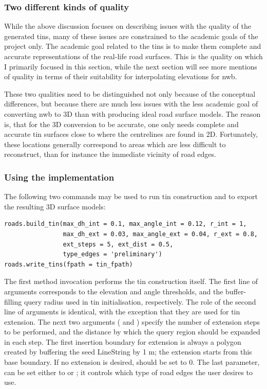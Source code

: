\subsubsection{Two different kinds of quality}

While the above discussion focuses on describing issues with the quality of the generated \ac{tin}s, many of these issues are constrained to the academic goals of the project only. The academic goal related to the \ac{tin}s is to make them complete and accurate representations of the real-life road surfaces. This is the quality on which I primarily focused in this section, while the next section will see more mentions of quality in terms of their suitability for interpolating elevations for \ac{nwb}.

These two qualities need to be distinguished not only because of the conceptual differences, but because there are much less issues with the less academic goal of converting \ac{nwb} to 3D than with producing ideal road surface models. The reason is, that for the 3D conversion to be accurate, one only needs complete and accurate \ac{tin} surfaces close to where the centrelines are found in 2D. Fortunately, these locations generally correspond to areas which are less difficult to reconstruct, than for instance the immediate vicinity of road edges.

\subsubsection{Using the implementation}

The following two commands may be used to run \ac{tin} construction and to export the resulting 3D surface models:

\begin{verbatim}
roads.build_tin(max_dh_int = 0.1, max_angle_int = 0.12, r_int = 1,
                max_dh_ext = 0.03, max_angle_ext = 0.04, r_ext = 0.8,
                ext_steps = 5, ext_dist = 0.5,
                type_edges = 'preliminary')
roads.write_tins(fpath = tin_fpath)
\end{verbatim}

The first method invocation performs the \ac{tin} construction itself. The first line of arguments corresponds to the elevation and angle thresholds, and the buffer-filling query radius used in \ac{tin} initialisation, respectively. The role of the second line of arguments is identical, with the exception that they are used for \ac{tin} extension. The next two arguments ( and ) specify the number of extension steps to be performed, and the distance by which the query region should be expanded in each step. The first insertion boundary for extension is always a polygon created by buffering the seed LineString by 1 m; the extension starts from this base boundary. If no extension is desired,  should be set to 0. The last parameter,  can be set either to  or ; it controls which type of road edges the user desires to use.

